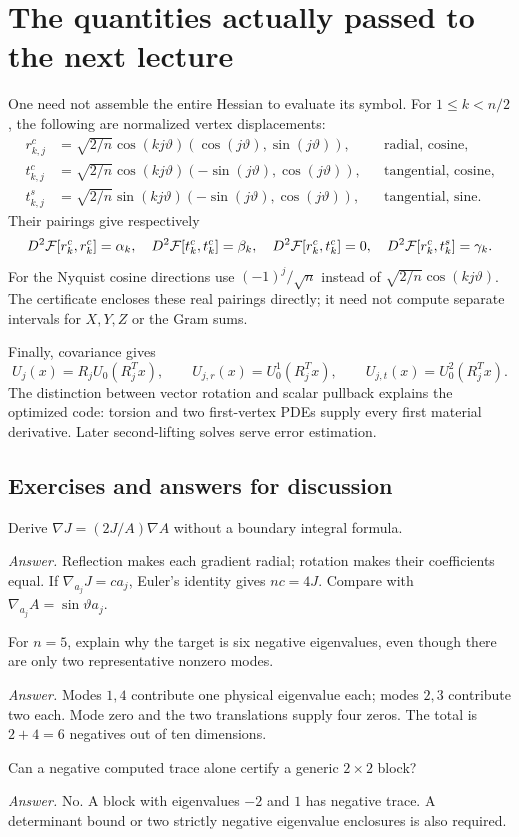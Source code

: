\section{The quantities actually passed to the next lecture}
\label{l1:pairings}
One need not assemble the entire Hessian to evaluate its symbol. For
$1\leq k<n/2$, the following are normalized vertex displacements:
\begin{align*}
 r^c_{k,j}&=\sqrt{2/n}\cos(kj\vartheta)
                     (\cos(j\vartheta),\sin(j\vartheta)),
                     &&\text{radial, cosine},\\
 t^c_{k,j}&=\sqrt{2/n}\cos(kj\vartheta)
                     (-\sin(j\vartheta),\cos(j\vartheta)),
                     &&\text{tangential, cosine},\\
 t^s_{k,j}&=\sqrt{2/n}\sin(kj\vartheta)
                     (-\sin(j\vartheta),\cos(j\vartheta)),
                     &&\text{tangential, sine}.
\end{align*}
Their pairings give respectively
\[
 D^2\mathcal F[r_k^c,r_k^c]=\alpha_k,\quad
 D^2\mathcal F[t_k^c,t_k^c]=\beta_k,\quad
 D^2\mathcal F[r_k^c,t_k^c]=0,\quad
 D^2\mathcal F[r_k^c,t_k^s]=\gamma_k.
\]
For the Nyquist cosine directions use $(-1)^j/\sqrt n$ instead of
$\sqrt{2/n}\cos(kj\vartheta)$. The certificate encloses these real
pairings directly; it need not compute separate intervals for $X,Y,Z$
or the Gram sums.

Finally, covariance gives
\[
 U_j(x)=R_jU_0(R_j^Tx),\qquad
 U_{j,r}(x)=U_0^1(R_j^Tx),\qquad
 U_{j,t}(x)=U_0^2(R_j^Tx).
\]
The distinction between vector rotation and scalar pullback explains the
optimized code: torsion and two first-vertex PDEs supply every first
material derivative. Later second-lifting solves serve error estimation.

\subsection*{Exercises and answers for discussion}
\begin{exercise}
Derive $\nabla J=(2J/A)\nabla A$ without a boundary integral formula.
\end{exercise}
\noindent\emph{Answer.} Reflection makes each gradient radial; rotation
makes their coefficients equal. If $\nabla_{a_j}J=c a_j$, Euler's identity
gives $nc=4J$. Compare with $\nabla_{a_j}A=\sin\vartheta a_j$.

\begin{exercise}
For $n=5$, explain why the target is six negative eigenvalues, even though
there are only two representative nonzero modes.
\end{exercise}
\noindent\emph{Answer.} Modes $1,4$ contribute one physical eigenvalue each;
modes $2,3$ contribute two each. Mode zero and the two translations supply
four zeros. The total is $2+4=6$ negatives out of ten dimensions.

\begin{exercise}
Can a negative computed trace alone certify a generic $2\times2$ block?
\end{exercise}
\noindent\emph{Answer.} No. A block with eigenvalues $-2$ and $1$ has
negative trace. A determinant bound or two strictly negative eigenvalue
enclosures is also required.
